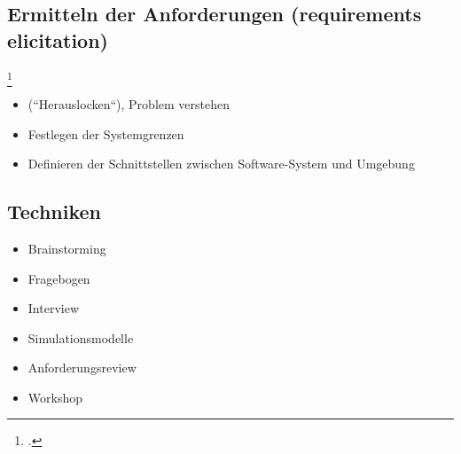 \documentclass{lehramt-informatik-haupt}
\begin{document}
%

\subsection{Ermitteln der Anforderungen (requirements elicitation)}\footcite[Seite
15]{sosy:fs:1}

\begin{itemize}
\item (“Herauslocken“), Problem verstehen
\item Festlegen der Systemgrenzen
\item Definieren der Schnittstellen zwischen Software-System und Umgebung
\end{itemize}

\subsection{Techniken}

\begin{itemize}
\item Brainstorming
\item Fragebogen
\item Interview
\item Simulationsmodelle
\item Anforderungsreview
\item Workshop
\end{itemize}

\literatur
\end{document}
